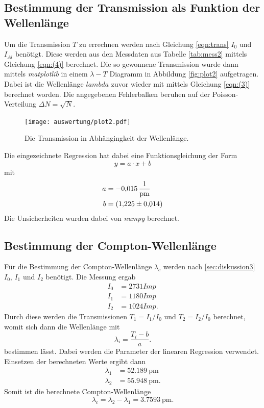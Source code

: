 \subsection{Bestimmung der Transmission als Funktion der Wellenlänge}
\label{sec:transmission}
Um die Transmission $T$ zu errechnen werden nach Gleichung \eqref{eqn:trans} $I_{0}$ und $I_{Al}$ benötigt. Diese werden aus den Messdaten
aus Tabelle \ref{tab:mess2} mittels Gleichung \eqref{eqn:(4)} berechnet. Die so gewonnene Transmission wurde dann mittels 
\textit{matplotlib} \cite{matplotlib} in einem $\lambda-T$ Diagramm in Abbildung \ref{fig:plot2} aufgetragen. Dabei ist die Wellenlänge
$lambda$ zuvor wieder mit mittels Gleichung \eqref{eqn:(3)} berechnet worden. Die angegebenen Fehlerbalken beruhen auf der Poisson-Verteilung
$\Delta N=\sqrt{N}$.
\begin{figure}[H]
    \centering
    \texttt{[image: auswertung/plot2.pdf]}
    \caption{Die Transmission in Abhängingkeit der Wellenlänge.}
    \label{fig:plot1}
\end{figure}
\noindent
Die eingezeichnete Regression hat dabei eine Funktionsgleichung der Form
  \begin{equation*}
      y=a\cdot x+b \label{eqn:gerade}
  \end{equation*} 
mit
  \begin{align*}
    a &= \SI{-0.015 \pm 0.000}{\per\pico\metre}\\
    b &= \SI{1.225 \pm 0.014}.
  \end{align*}
Die Unsicherheiten wurden dabei von  \textit{numpy} \cite{numpy} berechnet.

\subsection{Bestimmung der Compton-Wellenlänge}
\label{sec:compton}
Für die Bestimmung der Compton-Wellenlänge $\lambda_c$ werden nach \ref{sec:diskussion3} $I_0$, $I_1$ und $I_2$ benötigt.
Die Messung ergab
\begin{align*}
    I_0 &= 2731 \si{Imp}\\
    I_1 &= 1180 \si{Imp}\\
    I_2 &= 1024 \si{Imp}.
\end{align*}  
Durch diese werden die Transmissionen $T_1=I_1/I_0$ und  $T_2=I_2/I_0$ berechnet, womit sich dann die Wellenlänge mit
\begin{equation*}
    \lambda_i = \frac{T_i -b}{a}. 
\end{equation*}
bestimmen lässt. Dabei werden die Parameter der linearen Regression verwendet.
Einsetzen der berechneten Werte ergibt dann
\begin{align*}
    \lambda_1 &= \SI{52.189}{\pico\metre}\\
    \lambda_2 &= \SI{55.948}{\pico\metre}.
\end{align*}
Somit ist die berechnete Compton-Wellenlänge
\begin{equation*}
    \lambda_c=\lambda_2-\lambda_1= \SI{3.7593}{\pico\metre}.
\end{equation*}